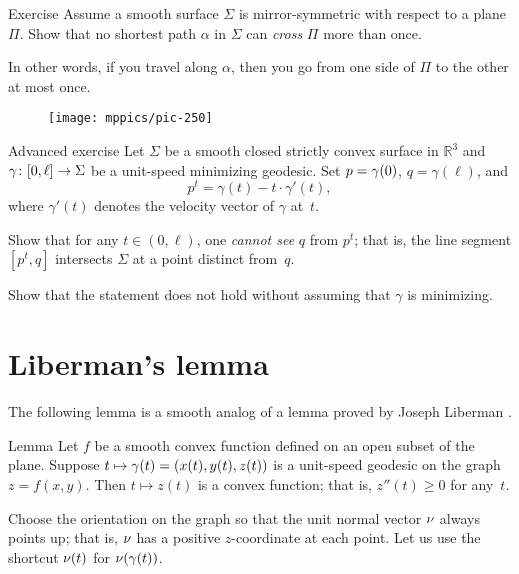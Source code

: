 \begin{thm}{Exercise}\label{ex:min-geod+plane}
Assume a smooth surface $\Sigma$ is mirror-symmetric with respect to a plane $\Pi$.
Show that no shortest path $\alpha$ in $\Sigma$ can {}\emph{cross} $\Pi$ more than once.


In other words, if you travel along $\alpha$, then you go from one side of $\Pi$ to the other at most once. 
\end{thm}

{

\begin{wrapfigure}{r}{40 mm}
\vskip-10mm
\centering
\texttt{[image: mppics/pic-250]}
\vskip-0mm
\end{wrapfigure}

\begin{thm}{Advanced exercise}\label{ex:milka}
Let $\Sigma$ be a smooth closed strictly convex surface 
in $\mathbb{R}^3$ 
and $\gamma\:[0,\ell]\z\to \Sigma$ be a unit-speed minimizing geodesic.
Set $p\z=\gamma(0)$, $q=\gamma(\ell)$, and 
$$p^t=\gamma(t)-t\cdot\gamma'(t),$$ 
where $\gamma'(t)$ denotes the velocity vector of $\gamma$ at~$t$.

Show that for any $t\in (0,\ell)$,
one {}\emph{cannot see} $q$ from $p^t$;
that is, the line segment $[p^t,q]$ intersects $\Sigma$ at a point distinct from~$q$.

Show that the statement does not hold without assuming that $\gamma$ is minimizing.
\end{thm}

}

\section{Liberman's lemma}

The following lemma is a smooth analog of a lemma proved by Joseph Liberman \cite{liberman}.

\begin{thm}{Lemma}
\label{lem:liberman}
Let $f$ be a smooth convex function defined on an open subset of the plane.
Suppose $t\mapsto \gamma(t)\z=(x(t),y(t),z(t))$ is a unit-speed geodesic on the graph $z=f(x,y)$.
Then $t\mapsto z(t)$ is a convex function; that is, $z''(t)\ge 0$ for any~$t$.
\end{thm}

Choose the orientation on the graph so that the unit normal vector $\nu$ always points up;
that is, $\nu$ has a positive $z$-coordinate at each point.
Let us use the shortcut $\nu(t)$ for $\nu(\gamma(t))$.

